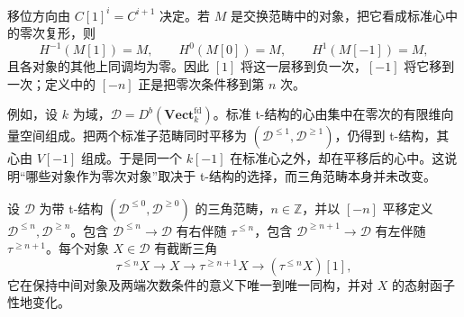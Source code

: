 移位方向由 \(C[1]^i=C^{i+1}\) 决定。若 \(M\) 是交换范畴中的对象，把它看成标准心中的零次复形，则
\[
	H^{-1}(M[1])=M,\qquad H^0(M[0])=M,\qquad H^1(M[-1])=M,
\]
且各对象的其他上同调均为零。因此 \([1]\) 将这一层移到负一次，\([-1]\) 将它移到一次；定义中的 \([-n]\) 正是把零次条件移到第 \(n\) 次。

\ProseParagraphBreak
例如，设 \(k\) 为域，\(\mathcal D=D^b(\mathbf{Vect}_k^{\mathrm{fd}})\)。标准 t-结构的心由集中在零次的有限维向量空间组成。把两个标准子范畴同时平移为 \((\mathcal D^{\le1},\mathcal D^{\ge1})\)，仍得到 t-结构，其心由 \(V[-1]\) 组成。于是同一个 \(k[-1]\) 在标准心之外，却在平移后的心中。这说明“哪些对象作为零次对象”取决于 t-结构的选择，而三角范畴本身并未改变。

\begin{theorem}\label{b4:thm:t-truncation-adjunction}
	设 \(\mathcal D\) 为带 t-结构 \((\mathcal D^{\le0},\mathcal D^{\ge0})\) 的三角范畴，\(n\in\mathbb Z\)，并以 \([-n]\) 平移定义 \(\mathcal D^{\le n},\mathcal D^{\ge n}\)。包含 \(\mathcal D^{\le n}\to\mathcal D\) 有右伴随 \(\tau^{\le n}\)，包含 \(\mathcal D^{\ge n+1}\to\mathcal D\) 有左伴随 \(\tau^{\ge n+1}\)。每个对象 \(X\in\mathcal D\) 有截断三角
	\[
		\tau^{\le n}X\longrightarrow X\longrightarrow\tau^{\ge n+1}X \longrightarrow(\tau^{\le n}X)[1],
	\]
	它在保持中间对象及两端次数条件的意义下唯一到唯一同构，并对 \(X\) 的态射函子性地变化。
\end{theorem}
